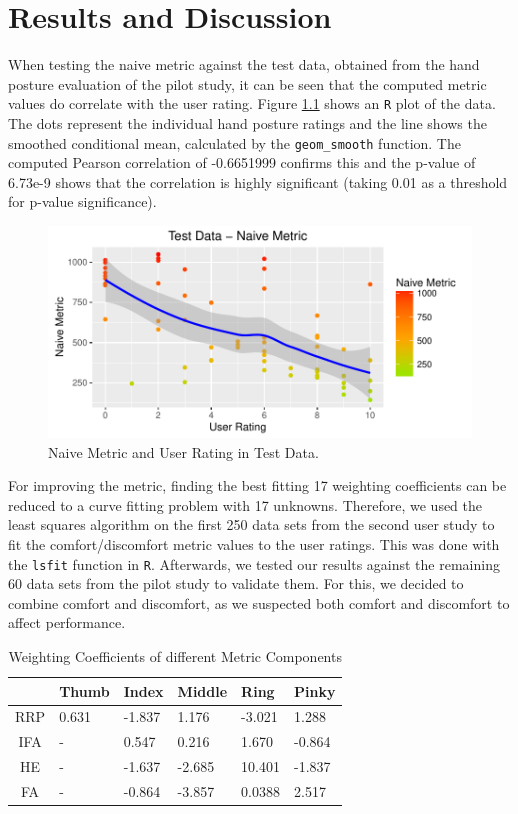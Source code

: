 \chapter{Results and Discussion}\label{chapter:results}

When testing the naive metric against the test data, obtained from the hand posture evaluation of the pilot study, it can be seen that the computed metric values do correlate with the user rating. Figure \ref{fig:testDataNaive} shows an \texttt{R} plot of the data. The dots represent the individual hand posture ratings and the line shows the smoothed conditional mean, calculated by the \texttt{geom\_smooth} function. The computed Pearson correlation of -0.6651999 confirms this and the p-value of 6.73e-9 shows that the correlation is highly significant (taking 0.01 as a threshold for p-value significance). 

\begin{figure}[h]
\includegraphics[width=\textwidth]{TestDataNaive}
\caption{Naive Metric and User Rating in Test Data.}
\label{fig:testDataNaive}
\end{figure}

For improving the metric, finding the best fitting 17 weighting coefficients can be reduced to a curve fitting problem with 17 unknowns. Therefore, we used the least squares algorithm on the first 250 data sets from the second user study to fit the comfort/discomfort metric values to the user ratings. This was done with the \texttt{lsfit} function in \texttt{R}. Afterwards, we tested our results against the remaining 60 data sets from the pilot study to validate them. For this, we decided to combine comfort and discomfort, as we suspected both comfort and discomfort to affect performance.

\begin{table}
\centering
\caption{Weighting Coefficients of different Metric Components}
\label{tab:coeff}
\begin{tabular}{|c|l|l|l|l|l|} \hline
 &Thumb&Index&Middle&Ring&Pinky\\ \hline
RRP&0.631&-1.837&1.176&-3.021&1.288\\ \hline
IFA&-&0.547&0.216&1.670&-0.864\\ \hline
HE&-&-1.637&-2.685&10.401&-1.837\\ \hline
FA&-&-0.864&-3.857&0.0388&2.517\\
\hline\end{tabular}
\end{table}

